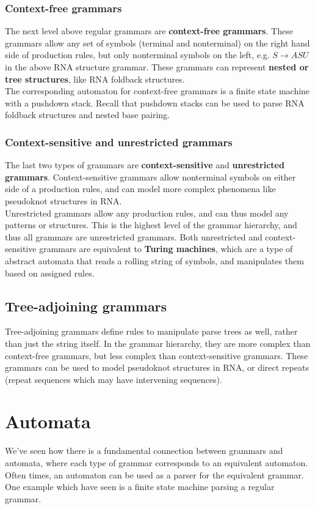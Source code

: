 \documentclass[12pt]{article}
\begin{document}
\subsubsection{Context-free grammars}
The next level above regular grammars are \textbf{context-free grammars}. These grammars allow any set of symbols (terminal and nonterminal) on the right hand side of production rules, but only nonterminal symbols on the left, e.g. $S \rightarrow ASU$ in the above RNA structure grammar. These grammars can represent \textbf{nested or tree structures}, like RNA foldback structures.\\[10pt]
The corresponding automaton for context-free grammars is a finite state machine with a pushdown stack. Recall that pushdown stacks can be used to parse RNA foldback structures and nested base pairing.

\subsubsection{Context-sensitive and unrestricted grammars}
The last two types of grammars are \textbf{context-sensitive} and \textbf{unrestricted grammars}. Context-sensitive grammars allow nonterminal symbols on either side of a production rules, and can model more complex phenomena like pseudoknot structures in RNA.\\[10pt]
Unrestricted grammars allow any production rules, and can thus model any patterns or structures. This is the highest level of the grammar hierarchy, and thus all grammars are unrestricted grammars. Both unrestricted and context-sensitive grammars are equivalent to \textbf{Turing machines}, which are a type of abstract automata that reads a rolling string of symbols, and manipulates them based on assigned rules.

\subsection{Tree-adjoining grammars}
Tree-adjoining grammars define rules to manipulate parse trees as well, rather than just the string itself. In the grammar hierarchy, they are more complex than context-free grammars, but less complex than context-sensitive grammars.  These grammars can be used to model pseudoknot structures in RNA, or direct repeats (repeat sequences which may have intervening sequences).

\section{Automata}
We've seen how there is a fundamental connection between grammars and automata, where each type of grammar corresponds to an equivalent automaton. Often times, an automaton can be used as a parser for the equivalent grammar. One example which have seen is a finite state machine parsing a regular grammar. 
\end{document}
